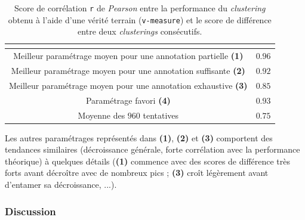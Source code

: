 			\begin{table}[!htb]
				\begin{center}
				\begin{tabular}{|c|r|}
				
					\hline
					\rowcolor{colorTableHeader!15}
					\multicolumn{1}{|c|}{\shortstack[c]{
						Paramétrage
					}}
						& \multicolumn{1}{c|}{\shortstack[c]{
							Corrélation
						}}
						\tabularnewline
						\hline \hline
					
					Meilleur paramétrage moyen pour une annotation partielle \textbf{(1)}
						& $0.96$
						\tabularnewline
						\hline
					
					Meilleur paramétrage moyen pour une annotation suffisante \textbf{(2)}
						& $0.92$
						\tabularnewline
						\hline
					
					Meilleur paramétrage moyen pour une annotation exhaustive \textbf{(3)}
						& $0.85$
						\tabularnewline
						\hline
					
					Paramétrage favori \textbf{(4)}
						& $0.93$
						\tabularnewline
						\hline
					
					Moyenne des $960$ tentatives
						& $0.75$
						\tabularnewline
						\hline
					
				\end{tabular}
				\end{center}
				\caption{
					Score de corrélation \texttt{r} de \textit{Pearson} entre la performance du \textit{clustering} obtenu à l'aide d'une vérité terrain (\texttt{v-measure}) et le score de différence entre deux \textit{clusterings} consécutifs.
				}
				\label{table:4.5.2-ETUDE-RENTABILITE-CORRELATION-SIMILARITE-PERFORMANCE}
			\end{table}
			
			Les autres paramétrages représentés dans \textbf{(1)}, \textbf{(2)} et \textbf{(3)} comportent des tendances similaires (décroissance générale, forte corrélation avec la performance théorique) à quelques détails (\textbf{(1)} commence avec des scores de différence très forts avant décroître avec de nombreux pics ; \textbf{(3)} croît légèrement avant d'entamer sa décroissance, ...).
			
		\subsubsection{Discussion}
		
